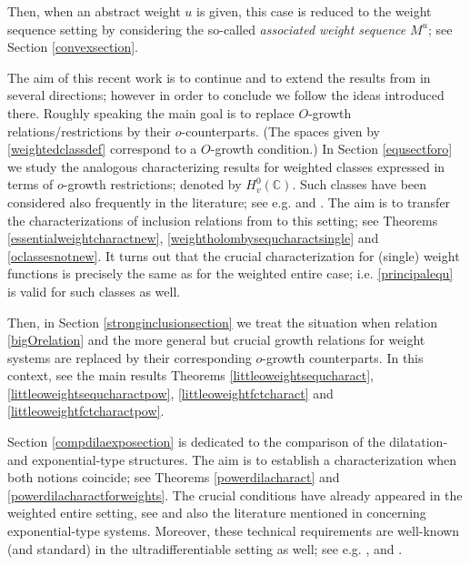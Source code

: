 \documentclass[10pt]{amsart}%
\numberwithin{equation}{section}
\theoremstyle{plain}
\newcommand{\CC}{\mathbb{C}}
\begin{document}
Then, when an abstract weight $u$ is given, this case is reduced to the weight sequence setting by considering the so-called {\itshape associated weight sequence} $M^u$; see Section \ref{convexsection}.\vspace{6pt}

The aim of this recent work is to continue and to extend the results from \cite{weightedentirecharacterization} in several directions; however in order to conclude we follow the ideas introduced there. Roughly speaking the main goal is to replace $O$-growth relations/restrictions by their $o$-counterparts. (The spaces given by \eqref{weightedclassdef} correspond to a $O$-growth condition.) In Section \ref{equsectforo} we study the analogous characterizing results for weighted classes expressed in terms of $o$-growth restrictions; denoted by $H^{0}_v(\CC)$. Such classes have been considered also frequently in the literature; see e.g. \cite[Sect. 1.B]{BierstedtBonetTaskinen98} and \cite{BonetDomanskiLindstroemTaskinen98}. The aim is to transfer the characterizations of inclusion relations from \cite[Sect. 3]{weightedentirecharacterization} to this setting; see Theorems \ref{essentialweightcharactnew}, \ref{weightholombysequcharactsingle} and \ref{oclassesnotnew}. It turns out that the crucial characterization for (single) weight functions is precisely the same as for the weighted entire case; i.e. \eqref{principalequ} is valid for such classes as well.\vspace{6pt}

Then, in Section \ref{stronginclusionsection} we treat the situation when relation \eqref{bigOrelation} and the more general but crucial growth relations for weight systems are replaced by their corresponding $o$-growth counterparts. In this context, see the main results Theorems \ref{littleoweightsequcharact}, \ref{littleoweightsequcharactpow}, \ref{littleoweightfctcharact} and \ref{littleoweightfctcharactpow}.\vspace{6pt}

Section \ref{compdilaexposection} is dedicated to the comparison of the dilatation- and exponential-type structures. The aim is to establish a characterization when both notions coincide; see Theorems \ref{powerdilacharact} and \ref{powerdilacharactforweights}. The crucial conditions have already appeared in the weighted entire setting, see \cite[Sect. 2.8 \& 2.9]{weightedentirecharacterization} and also the literature mentioned in \cite[Sect. 2.9]{weightedentirecharacterization} concerning exponential-type systems. Moreover, these technical requirements are well-known (and standard) in the ultradifferentiable setting as well; see e.g. \cite{Komatsu73}, \cite{BraunMeiseTaylor90} and \cite{BonetMeiseMelikhov07}.\vspace{6pt}
\end{document}
